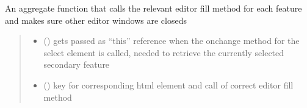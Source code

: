 \documentclass[letterpaper,10pt,english]{sphinxmanual}
\begin{document}

\begin{fulllineitems}
\label{\detokenize{docs_gui/js_api/urbs_editor/generate_urbs_setup_editor:fillSelectedEditor}}
\pysigstartsignatures
{}
\pysigstopsignatures
\sphinxAtStartPar
An aggregate function that calls the relevant editor fill method for each feature and makes sure other editor windows are closeds
\begin{quote}\begin{description}
\begin{itemize}
\item {} 
\sphinxAtStartPar
{} () \textendash{} gets passed as “this” reference when the onchange method for the select element is called, needed to retrieve the currently selected secondary feature

\item {} 
\sphinxAtStartPar
{} () \textendash{} key for corresponding html element and call of correct editor fill method

\end{itemize}

\end{description}\end{quote}

\end{fulllineitems}

\end{document}
